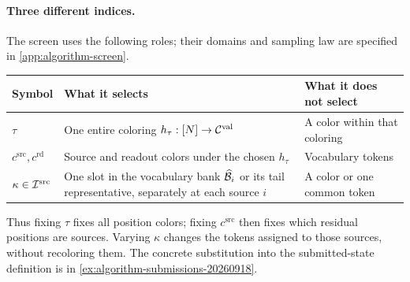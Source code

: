 \paragraph{Three different indices.}
The screen uses the following roles; their domains and sampling law are
specified in \cref{app:algorithm-screen}.
\par\smallskip
\noindent
\begin{tabularx}{\linewidth}{@{}lXX@{}}
\toprule
Symbol & What it selects & What it does not select\\
\midrule
$\tau$ & One entire coloring $h_\tau:[N]\to\mathcal C^{\mathrm{val}}$
       & A color within that coloring\\
$c^{\mathrm{src}},c^{\mathrm{rd}}$
       & Source and readout colors under the chosen $h_\tau$
       & Vocabulary tokens\\
$\kappa\in\mathcal I^{\mathrm{src}}$
       & One slot in the vocabulary bank $\widehat{\mathcal B}_{i}$ or its tail representative,
         separately at each source $i$
       & A color or one common token\\
\bottomrule
\end{tabularx}
\par\smallskip
Thus fixing $\tau$ fixes all position colors; fixing $c^{\mathrm{src}}$
then fixes which residual positions are sources. Varying $\kappa$
changes the tokens assigned to those sources, without recoloring them.
The concrete substitution into the submitted-state definition is in
\cref{ex:algorithm-submissions-20260918}.

